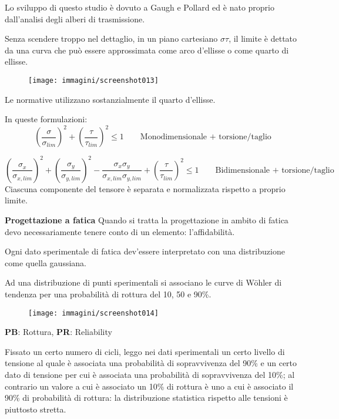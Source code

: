 \documentclass{article}
\begin{document}
\begin{adjustwidth}{2in}{}
			Lo sviluppo di questo studio è dovuto a Gaugh e Pollard ed è nato proprio dall'analisi degli alberi di trasmissione.
			
			Senza scendere troppo nel dettaglio, in un piano cartesiano $\sigma\tau$, il limite è dettato da una curva che può essere approssimata come arco d'ellisse o come quarto di ellisse. 
\begin{figure}[H]
	\centering
	\label{fig:screenshot013}
	\texttt{[image: immagini/screenshot013]}
\end{figure}			
			Le normative utilizzano sostanzialmente il quarto d'ellisse. 
			
			In queste formulazioni:
			\[\left(\dfrac{\sigma}{\sigma_{lim}}\right)^2 + \left(\dfrac{\tau}{\tau_{lim}}\right)^2\leq1 \qquad \text{Monodimensionale + torsione/taglio}\]
			
			\[\left(\dfrac{\sigma_x}{\sigma_{x,lim}}\right)^2 + \left(\dfrac{\sigma_y}{\sigma_{y,lim}}\right)^2 - \dfrac{\sigma_x\sigma_y}{\sigma_{x,lim}\sigma_{y,lim}} + \left(\dfrac{\tau}{\tau_{lim}}\right)^2\leq1 \qquad \text{Bidimensionale + torsione/taglio}\]
			Ciascuna componente del tensore è separata e normalizzata rispetto a proprio limite. \newpage
			
\textbf{{\LARGE Progettazione a fatica}} \mbox{} \newline						
			Quando si tratta la progettazione in ambito di fatica devo necessariamente tenere conto di un elemento: l'affidabilità. 
			
			Ogni dato sperimentale di fatica dev'essere interpretato con una distribuzione come quella gaussiana.
			
			Ad una distribuzione di punti sperimentali si associano le curve di Wöhler di tendenza per una probabilità di rottura del 10, 50 e 90\%. 
\begin{figure}[H]
	\centering
	\label{fig:screenshot014}
	\texttt{[image: immagini/screenshot014]}
\end{figure}
			\textbf{PB}: Rottura, \textbf{PR}: Reliability
			
			Fissato un certo numero di cicli, leggo nei dati sperimentali un certo livello di tensione al quale è associata una probabilità di sopravvivenza del 90\% e un certo dato di tensione per cui è associata una probabilità di sopravvivenza del 10\%; al contrario un valore a cui è associato un 10\% di rottura è uno a cui è associato il 90\% di probabilità di rottura: la distribuzione statistica rispetto alle tensioni è piuttosto stretta. \newline 
			

\end{adjustwidth}
\end{document}
